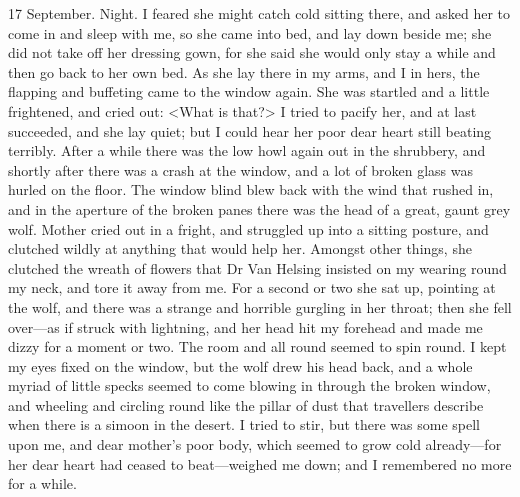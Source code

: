 \begin{diary}{17 September. Night.}
I feared she might catch cold sitting there, and asked her to come in and sleep with me, so she came into bed, and lay down beside me; she did not take off her dressing gown, for she said she would only stay a while and then go back to her own bed. As she lay there in my arms, and I in hers, the flapping and buffeting came to the window again. She was startled and a little frightened, and cried out: <What is that?> I tried to pacify her, and at last succeeded, and she lay quiet; but I could hear her poor dear heart still beating terribly. After a while there was the low howl again out in the shrubbery, and shortly after there was a crash at the window, and a lot of broken glass was hurled on the floor. The window blind blew back with the wind that rushed in, and in the aperture of the broken panes there was the head of a great, gaunt grey wolf. Mother cried out in a fright, and struggled up into a sitting posture, and clutched wildly at anything that would help her. Amongst other things, she clutched the wreath of flowers that Dr Van Helsing insisted on my wearing round my neck, and tore it away from me. For a second or two she sat up, pointing at the wolf, and there was a strange and horrible gurgling in her throat; then she fell over—as if struck with lightning, and her head hit my forehead and made me dizzy for a moment or two. The room and all round seemed to spin round. I kept my eyes fixed on the window, but the wolf drew his head back, and a whole myriad of little specks seemed to come blowing in through the broken window, and wheeling and circling round like the pillar of dust that travellers describe when there is a simoon in the desert. I tried to stir, but there was some spell upon me, and dear mother's poor body, which seemed to grow cold already—for her dear heart had ceased to beat—weighed me down; and I remembered no more for a while.


\end{diary}
